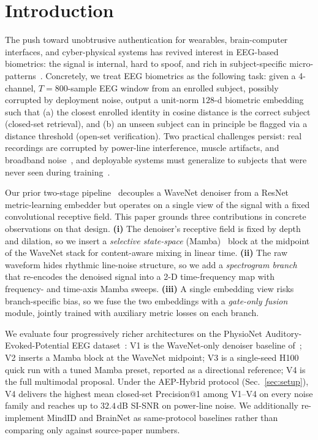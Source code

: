 \documentclass[conference,a4paper]{APSIPA2026}
\begin{document}
\section{Introduction}
The push toward unobtrusive authentication for wearables, brain-computer
interfaces, and cyber-physical systems has revived interest in
EEG-based biometrics: the signal is internal, hard to spoof, and rich in
subject-specific micro-patterns~\cite{fallahi2023brainnet,yang2022eeg,zhang2017mindid}.
Concretely, we treat EEG biometrics as the following task: given a
4-channel, $T=800$-sample EEG window from an enrolled subject, possibly
corrupted by deployment noise, output a unit-norm $128$-d biometric
embedding such that (a) the closest enrolled identity in cosine
distance is the correct subject (closed-set retrieval), and (b) an
unseen subject can in principle be flagged via a distance threshold
(open-set verification). Two practical challenges persist:
real recordings are corrupted by power-line interference, muscle
artifacts, and broadband noise~\cite{alzahab2024aep}, and deployable
systems must generalize to subjects that were never seen during
training~\cite{deng2019arcface,wang2019multisim}.

Our prior two-stage pipeline~\cite{vu2026aisei} decouples a WaveNet
denoiser from a ResNet metric-learning embedder but operates on a
single view of the signal with a fixed convolutional receptive field.
This paper grounds three contributions in concrete observations on
that design.
\textbf{(i)} The denoiser's receptive field is fixed by depth and
dilation, so we insert a \emph{selective state-space}
(Mamba)~\cite{gu2023mamba,gu2022s4} block at the midpoint of the
WaveNet stack for content-aware mixing in linear time.
\textbf{(ii)} The raw waveform hides rhythmic line-noise structure, so
we add a \emph{spectrogram branch} that re-encodes the denoised signal
into a 2-D time-frequency map with frequency- and time-axis Mamba
sweeps.
\textbf{(iii)} A single embedding view risks branch-specific bias, so
we fuse the two embeddings with a \emph{gate-only fusion}
module, jointly trained with auxiliary metric losses on each branch.

We evaluate four progressively richer architectures on the PhysioNet
Auditory-Evoked-Potential EEG dataset~\cite{alzahab2024aep}: V1 is the
WaveNet-only denoiser baseline of~\cite{vu2026aisei}; V2 inserts a
Mamba block at the WaveNet midpoint; V3 is a single-seed H100 quick
run with a tuned Mamba preset, reported as a directional reference;
V4 is the full multimodal proposal. Under the AEP-Hybrid protocol
(Sec.~\ref{sec:setup}), V4 delivers the highest mean closed-set
Precision@1 among V1--V4 on every noise family and reaches up to
$32.4$\,dB SI-SNR on power-line noise. We additionally re-implement
MindID and BrainNet as same-protocol baselines rather than comparing
only against source-paper numbers.
\end{document}
